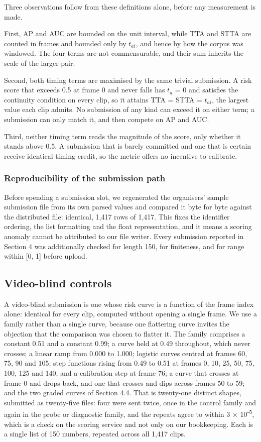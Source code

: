 Three observations follow from these definitions alone, before any measurement is made.

First, AP and AUC are bounded on the unit interval, while TTA and STTA are counted in frames and bounded only by \(t_{ai}\), and hence by how the corpus was windowed. The four terms are not commensurable, and their sum inherits the scale of the larger pair.

Second, both timing terms are maximised by the same trivial submission. A risk score that exceeds 0.5 at frame 0 and never falls has \(t_{a}\) = 0 and satisfies the continuity condition on every clip, so it attains TTA = STTA = \(t_{ai}\), the largest value each clip admits. No submission of any kind can exceed it on either term; a submission can only match it, and then compete on AP and AUC.

Third, neither timing term reads the magnitude of the score, only whether it stands above 0.5. A submission that is barely committed and one that is certain receive identical timing credit, so the metric offers no incentive to calibrate.

\subsubsection{Reproducibility of the submission path}
Before spending a submission slot, we regenerated the organisers'{} sample submission file from its own parsed values and compared it byte for byte against the distributed file: identical, 1,417 rows of 1,417. This fixes the identifier ordering, the list formatting and the float representation, and it means a scoring anomaly cannot be attributed to our file writer. Every submission reported in Section 4 was additionally checked for length 150, for finiteness, and for range within [0, 1] before upload.


\subsection{Video-blind controls}

A video-blind submission is one whose risk curve is a function of the frame index alone: identical for every clip, computed without opening a single frame. We use a family rather than a single curve, because one flattering curve invites the objection that the comparison was chosen to flatter it. The family comprises a constant 0.51 and a constant 0.99; a curve held at 0.49 throughout, which never crosses; a linear ramp from 0.000 to 1.000; logistic curves centred at frames 60, 75, 90 and 105; step functions rising from 0.49 to 0.51 at frames 0, 10, 25, 50, 75, 100, 125 and 140, and a calibration step at frame 76; a curve that crosses at frame 0 and drops back, and one that crosses and dips across frames 50 to 59; and the two graded curves of Section 4.4. That is twenty-one distinct shapes, submitted as twenty-five files: four were sent twice, once in the control family and again in the probe or diagnostic family, and the repeats agree to within 3 × 10\textsuperscript{-5}, which is a check on the scoring service and not only on our bookkeeping. Each is a single list of 150 numbers, repeated across all 1,417 clips.


